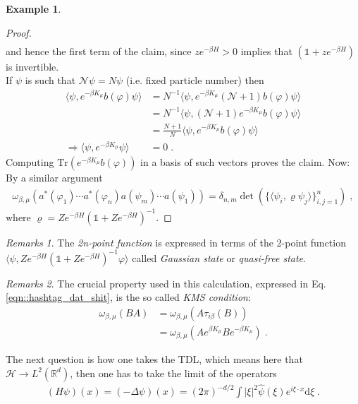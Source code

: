 \documentclass[
a4paper, %
11pt, %
onecolumn, %
openany, %
]{memoir}
\theoremstyle{definition}
\newtheorem{example}{Example}[chapter]
\theoremstyle{remark}
\newtheorem{remarks}{Remarks}[chapter]
\theoremstyle{plain}
\begin{document}
\begin{example}
\begin{proof}
\begin{align}
	\end{align}
	and hence the first term of the claim, since $ze^{-\beta H}>0$ implies that $(\mathds{1}+ze^{-\beta H})$ is invertible.\\
	If $\psi$ is such that $\mathcal{N}\psi= N\psi$ (i.e. fixed particle number) then \begin{align}
	\langle \psi,e^{-\beta K_{\mu}}b(\varphi)\psi\rangle &={N}^{-1}\langle \psi , e^{-\beta K_{\mu}}(\mathcal{N}+1)b(\varphi)\psi\rangle\\
	&= N^{-1}\langle \psi, (\mathcal{N}+1)e^{-\beta K_{\mu}}b(\varphi)\psi\rangle\\
	&=\frac{N+1}{N}\langle \psi, e^{-\beta K_{\mu}}b(\varphi)\psi\rangle\\
	\Rightarrow \langle \psi,e^{-\beta K_{\mu}}\psi\rangle&=0\; .
	\end{align}
	Computing $\mathrm{Tr}(e^{-\beta K_{\mu}}b(\varphi))$ in a basis of such vectors proves the claim. Now: By a similar argument \begin{align}
	\omega_{\beta,\mu}(a^*(\varphi_1)\cdots a^{*}(\varphi_n)a(\psi_m)\cdots a(\psi_1))=\delta_{n,m}\det\left(\{\langle\psi_i,\varrho\psi_j\rangle\}_{i,j=1}^{n}\right)\; ,	\end{align}$\text{where }\varrho = Ze^{-\beta H}(\mathds{1}+Ze^{-\beta H})^{-1}$.
\end{proof}
\end{example}
\begin{remarks}
	The \textit{2n-point function} is expressed in terms of the 2-point function $\langle \psi, Ze^{-\beta H}(\mathds{1}+Ze^{-\beta H})^{-1}\varphi\rangle$ called \textit{Gaussian state} or \textit{quasi-free state}.
\end{remarks}
\begin{remarks}
	The crucial property used in this calculation, expressed in Eq. \eqref{eqn::hashtag_dat_shit}, is the so called \textit{KMS condition}: \begin{align}
	\omega_{\beta,\mu}(BA)&=\omega_{\beta,\mu}(A\tau_{i\beta}(B))\\
	&=\omega_{\beta,\mu}(Ae^{\beta K_{\mu}}Be^{-\beta K_{\mu}})\; .
	\end{align}
\end{remarks}
The next question is how one takes the TDL, which means here that $\mathcal{H}\rightarrow L^2(\mathbb{R}^d)$, then one has to take the limit of the operators \begin{align}
(H\psi)(x)=(-\Delta \psi)(x)=(2\pi)^{-d/2}\int |\xi|^2\hat{\psi}(\xi)e^{i\xi\cdot x}\mathrm{d}\xi\; .
\end{align}
\end{document}
